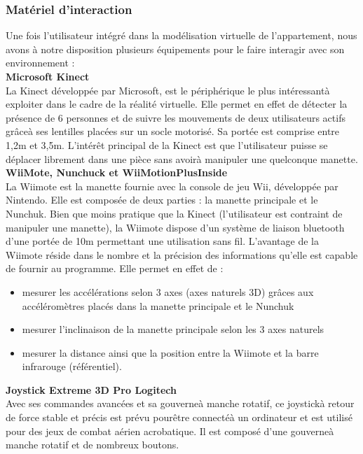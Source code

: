 \subsubsection{Matériel d'interaction}
Une fois l'utilisateur intégré dans la modélisation virtuelle de l'appartement, nous avons à notre disposition plusieurs équipements pour le faire interagir avec son environnement :
\\

\textbf{Microsoft Kinect}
\\

La Kinect développée par Microsoft, est le périphérique le plus intéressantà exploiter dans le cadre de la réalité virtuelle. Elle permet en effet de détecter la présence de 6 personnes et de suivre les mouvements de deux utilisateurs actifs grâceà ses lentilles placées sur un socle motorisé. Sa portée est comprise entre 1,2m et 3,5m. L'intérêt principal de la Kinect est que l'utilisateur puisse se déplacer librement dans une pièce sans avoirà manipuler une quelconque manette.
\\

\textbf{WiiMote, Nunchuck et WiiMotionPlusInside}
\\

La Wiimote est la manette fournie avec la console de jeu Wii, développée par Nintendo. Elle est composée de deux parties : la manette principale et le Nunchuk. Bien que moins pratique que la Kinect (l'utilisateur est contraint de manipuler une manette), la Wiimote dispose d'un système de liaison bluetooth d'une portée de 10m permettant une utilisation sans fil. L'avantage de la Wiimote réside dans le nombre et la précision des informations qu'elle est capable de fournir au programme. 
\newline
Elle permet en effet de :
\begin{itemize}
  \item mesurer les accélérations selon 3 axes (axes naturels 3D) grâces aux accéléromètres placés dans la manette principale et le Nunchuk
  \item mesurer l'inclinaison de la manette principale selon les 3 axes naturels
  \item mesurer la distance ainsi que la position entre la Wiimote et la barre infrarouge (référentiel).
\end{itemize}

\textbf{Joystick Extreme 3D Pro Logitech}
\\

Avec ses commandes avancées et sa gouverneà manche rotatif, ce joystickà retour de force stable et précis est prévu pourêtre connectéà un ordinateur et est utilisé pour des jeux de combat aérien acrobatique. Il est composé d'une gouverneà manche rotatif et de nombreux boutons.
\\

